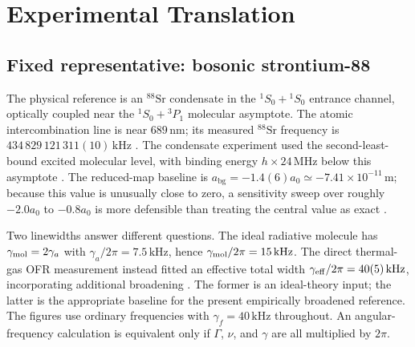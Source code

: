 \documentclass[9pt,a4paper,twocolumn,twoside]{rho-class/rho}
\newcommand{\abg}{a_{\mathrm{bg}}}
\begin{document}
\section{Experimental Translation}\label{sec:experiment}

    \subsection{Fixed representative: bosonic strontium-88}

        The physical reference is an $^{88}\mathrm{Sr}$ condensate in the
        $^1S_0+{}^1S_0$ entrance channel, optically coupled near the
        $^1S_0+{}^3P_1$ molecular asymptote. The atomic intercombination line is
        near $689\,\mathrm{nm}$; its measured $^{88}\mathrm{Sr}$ frequency is
        $434\,829\,121\,311(10)\,\mathrm{kHz}$
        \cite{ferrari2003precision}. The condensate experiment used the
        second-least-bound excited molecular level, with binding energy
        $h\times24\,\mathrm{MHz}$ below this asymptote
        \cite{yan2013controlling}.  The reduced-map baseline is
        $\abg=-1.4(6)a_0\simeq-7.41\times10^{-11}\,\mathrm{m}$; because this
        value is unusually close to zero, a sensitivity sweep over roughly
        $-2.0a_0$ to $-0.8a_0$ is more defensible than treating the central
        value as exact \cite{blatt2011measurement}.

        Two linewidths answer different questions.  The ideal radiative
        molecule has $\gamma_{\rm mol}=2\gamma_a$ with
        $\gamma_a/2\pi=7.5\,\mathrm{kHz}$, hence
        $\gamma_{\rm mol}/2\pi=15\,\mathrm{kHz}$.  The direct thermal-gas OFR
        measurement instead fitted an effective total width
        $\gamma_{\rm eff}/2\pi=40(5)\,\mathrm{kHz}$, incorporating additional
        broadening \cite{blatt2011measurement}.  The former is an ideal-theory
        input; the latter is the appropriate baseline for the present
        empirically broadened reference.  The figures use ordinary frequencies
        with $\gamma_f=40\,\mathrm{kHz}$ throughout.  An angular-frequency
        calculation is equivalent only if $\Gamma$, $\nu$, and $\gamma$ are all
        multiplied by $2\pi$.
\end{document}
